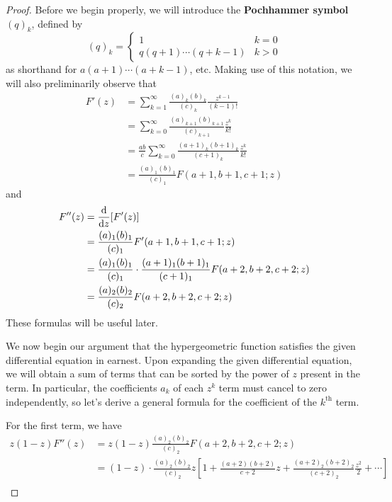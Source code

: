 \documentclass[../psets.tex]{subfiles}
\begin{document}
\begin{enumerate}[ref={A.\arabic*}]
\begin{proof}
        Before we begin properly, we will introduce the \textbf{Pochhammer symbol} $(q)_k$, defined by
        \begin{equation*}
            (q)_k =
            \begin{cases}
                1 & k=0\\
                q(q+1)\cdots(q+k-1) & k>0
            \end{cases}
        \end{equation*}
        as shorthand for $a(a+1)\cdots(a+k-1)$, etc. Making use of this notation, we will also preliminarily observe that
        \begin{align*}
            F'(z) &= \sum_{k=1}^\infty\frac{(a)_k(b)_k}{(c)_k}\frac{z^{k-1}}{(k-1)!}\\
            &= \sum_{k=0}^\infty\frac{(a)_{k+1}(b)_{k+1}}{(c)_{k+1}}\frac{z^k}{k!}\\
            &= \frac{ab}{c}\sum_{k=0}^\infty\frac{(a+1)_k(b+1)_k}{(c+1)_k}\frac{z^k}{k!}\\
            &= \frac{(a)_1(b)_1}{(c)_1}F(a+1,b+1,c+1;z)
        \end{align*}
        and
        \begin{align*}
            F''(z) &= \dv{z}[F'(z)]\\
            &= \frac{(a)_1(b)_1}{(c)_1}F'(a+1,b+1,c+1;z)\\
            &= \frac{(a)_1(b)_1}{(c)_1}\cdot\frac{(a+1)_1(b+1)_1}{(c+1)_1}F(a+2,b+2,c+2;z)\\
            &= \frac{(a)_2(b)_2}{(c)_2}F(a+2,b+2,c+2;z)
        \end{align*}
        These formulas will be useful later.\par
        We now begin our argument that the hypergeometric function satisfies the given differential equation in earnest. Upon expanding the given differential equation, we will obtain a sum of terms that can be sorted by the power of $z$ present in the term. In particular, the coefficients $a_k$ of each $z^k$ term must cancel to zero independently, so let's derive a general formula for the coefficient of the $k^\text{th}$ term.\par
        For the first term, we have
        \begin{align*}
            z(1-z)F''(z) &= z(1-z)\frac{(a)_2(b)_2}{(c)_2}F(a+2,b+2,c+2;z)\\
            &= (1-z)\cdot\frac{(a)_2(b)_2}{(c)_2}z\left[ 1+\frac{(a+2)(b+2)}{c+2}z+\frac{(a+2)_2(b+2)_2}{(c+2)_2}\frac{z^2}{2}+\cdots \right]\\

\end{align*}
\end{proof}
\end{enumerate}
\end{document}
